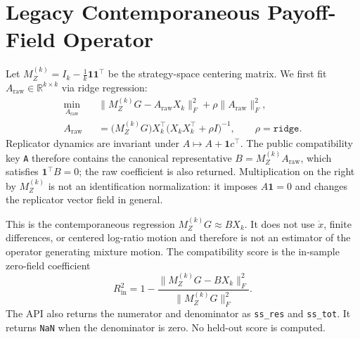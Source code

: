 \documentclass[11pt]{article}
\newcommand{\one}{\mathbf{1}}
\newcommand{\R}{\mathbb{R}}
\begin{document}
\section{Legacy Contemporaneous Payoff-Field Operator}
Let $M_Z^{(k)}=I_k-\tfrac{1}{k}\one\one^\top$ be the strategy-space centering matrix. We first fit $A_{\mathrm{raw}}\in\R^{k\times k}$ via ridge regression:
\begin{align}
\label{eq:ridge-A}
\min_{A_{\mathrm{raw}}}\quad
&\big\|M_Z^{(k)}G-A_{\mathrm{raw}}X_k\big\|_F^2
  +\rho\|A_{\mathrm{raw}}\|_F^2,\\
A_{\mathrm{raw}}
&=\big(M_Z^{(k)}G\big)X_k^\top
  \big(X_kX_k^\top+\rho I\big)^{-1},
  \qquad \rho=\texttt{ridge}.
\end{align}
Replicator dynamics are invariant under $A\mapsto A+\one c^\top$. The public
compatibility key \texttt{A} therefore contains the canonical representative
$B=M_Z^{(k)}A_{\mathrm{raw}}$, which satisfies $\one^\top B=0$; the raw
coefficient is also returned. Multiplication on the right by $M_Z^{(k)}$ is not
an identification normalization: it imposes $A\one=0$ and changes the
replicator vector field in general.

This is the contemporaneous regression $M_Z^{(k)}G\approx BX_k$. It does not use
$\dot x$, finite differences, or centered log-ratio motion and therefore is not
an estimator of the operator generating mixture motion. The compatibility score
is the in-sample zero-field coefficient
\begin{equation}
R^2_{\mathrm{in}}=1-
\frac{\|M_Z^{(k)}G-BX_k\|_F^2}{\|M_Z^{(k)}G\|_F^2}.
\end{equation}
The API also returns the numerator and denominator as \texttt{ss\_res} and
\texttt{ss\_tot}. It returns \texttt{NaN} when the denominator is zero. No
held-out score is computed.
\end{document}
